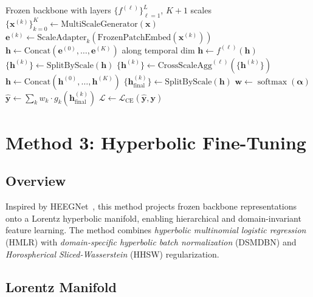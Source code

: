 \documentclass{article}
\DeclareMathOperator{\softmax}{softmax}
\newcommand{\mL}{\mathcal{L}}
\newcommand{\bx}{\bm{x}}
\begin{document}
\begin{algorithm}[H]
\caption{Multi-Scale Fine-Tuning (MSFT)}
\begin{algorithmic}[1]
\REQUIRE Frozen backbone with layers $\{f^{(\ell)}\}_{\ell=1}^L$, $K{+}1$ scales
\STATE $\{\bx^{(k)}\}_{k=0}^K \leftarrow \text{MultiScaleGenerator}(\bx)$
  \STATE $\bm{e}^{(k)} \leftarrow \text{ScaleAdapter}_k\!\left(\text{FrozenPatchEmbed}(\bx^{(k)})\right)$
\ENDFOR
\STATE $\bm{h} \leftarrow \text{Concat}(\bm{e}^{(0)}, \ldots, \bm{e}^{(K)})$ along temporal dim
  \STATE $\bm{h} \leftarrow f^{(\ell)}(\bm{h})$ 
  \STATE $\{\bm{h}^{(k)}\} \leftarrow \text{SplitByScale}(\bm{h})$
  \STATE $\{\bm{h}^{(k)}\} \leftarrow \text{CrossScaleAgg}^{(\ell)}(\{\bm{h}^{(k)}\})$ 
  \STATE $\bm{h} \leftarrow \text{Concat}(\bm{h}^{(0)}, \ldots, \bm{h}^{(K)})$
\ENDFOR
\STATE $\{\bm{h}^{(k)}_\text{final}\} \leftarrow \text{SplitByScale}(\bm{h})$
\STATE $\bm{w} \leftarrow \softmax(\bm{\alpha})$
\STATE $\hat{\bm{y}} \leftarrow \sum_k w_k \cdot g_k(\bm{h}^{(k)}_\text{final})$
\STATE $\mL \leftarrow \mL_\text{CE}(\hat{\bm{y}}, \bm{y})$
\end{algorithmic}
\end{algorithm}

\section{Method 3: Hyperbolic Fine-Tuning}
\label{sec:hyperbolic}

\subsection{Overview}
Inspired by HEEGNet~\cite{li2026heegnet}, this method projects frozen backbone representations onto a Lorentz hyperbolic manifold, enabling hierarchical and domain-invariant feature learning.
The method combines \emph{hyperbolic multinomial logistic regression} (HMLR) with \emph{domain-specific hyperbolic batch normalization} (DSMDBN) and \emph{Horospherical Sliced-Wasserstein} (HHSW) regularization.

\subsection{Lorentz Manifold}
\end{document}
